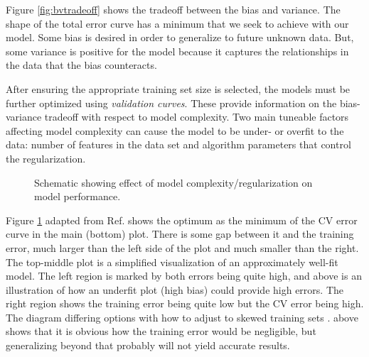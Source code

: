 Figure \ref{fig:bvtradeoff} shows the tradeoff between the bias and variance.
The shape of the total error curve has a minimum that we seek to achieve with
our model. Some bias is desired in order to generalize to future unknown data.
But, some variance is positive for the model because it captures the
relationships in the data that the bias counteracts. 





After ensuring the appropriate training set size is selected, the models must
be further optimized using \textit{validation curves}.  These provide
information on the bias-variance tradeoff with respect to model complexity. Two
main tuneable factors affecting model complexity can cause the model to be
under- or overfit to the data: number of features in the data set and algorithm
parameters that control the regularization.

\begin{figure}[!htb]
  \centering
  \caption{Schematic showing effect of model complexity/regularization on model 
           performance.}
  \label{fig:validation}
\end{figure}

Figure \ref{fig:validation} adapted from Ref. \cite{elements_stats} shows the
optimum as the minimum of the \gls{CV} error curve in the main (bottom)
plot. There is some gap between it and the training error, much larger than the
left side of the plot and much smaller than the right.  The top-middle plot is
a simplified visualization of an approximately well-fit model.  The left region
is marked by both errors being quite high, and above is an  illustration of how
an underfit plot (high bias) could provide high errors. The right region shows
the training error being quite low but the \gls{CV} error being high.
The diagram differing options with how to adjust to skewed training sets
\cite{scikit}.  above shows that it is obvious how the training error would be
negligible, but generalizing beyond that probably will not yield accurate
results. 

